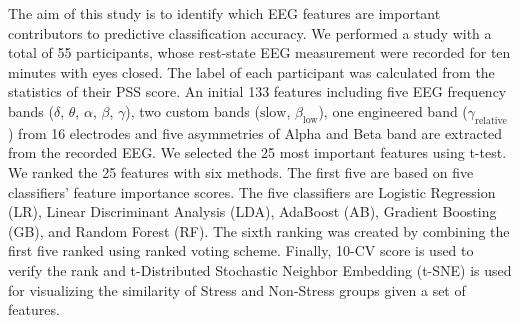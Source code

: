 \documentclass[pdflatex,sn-mathphys]{sn-jnl}%
\theoremstyle{thmstyleone}%
\theoremstyle{thmstyletwo}%
\theoremstyle{thmstylethree}%
\begin{document}
The aim of this study is to identify which EEG features are important contributors to predictive classification accuracy. We performed a study with a total of 55 participants, whose rest-state EEG measurement were recorded for ten minutes with eyes closed. The label of each participant was calculated from the statistics of their PSS score. An initial 133 features including five EEG frequency bands ($\delta$, $\theta$, $\alpha$, $\beta$, $\gamma$), two custom bands ($\text{slow}$, $\beta_{\text{low}}$), one engineered band ($\gamma_{\text{relative}}$) from 16 electrodes and five asymmetries of Alpha and Beta band are extracted from the recorded EEG. We selected the 25 most important features using t-test. We ranked the 25 features with six methods. The first five are based on five classifiers' feature importance scores. The five classifiers are Logistic Regression (LR), Linear Discriminant Analysis (LDA), AdaBoost (AB), Gradient Boosting (GB), and Random Forest (RF). The sixth ranking was created by combining the first five ranked using ranked voting scheme. Finally, 10-CV score is used to verify the rank and t-Distributed Stochastic Neighbor Embedding (t-SNE) is used for visualizing the similarity of Stress and Non-Stress groups given a set of features.

\end{document}
